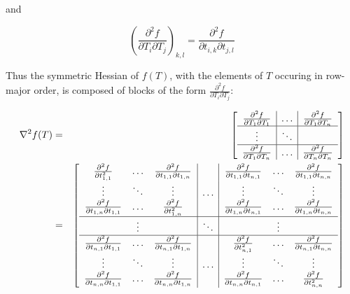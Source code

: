 \documentclass{report}
\begin{document}
and

\begin{equation}
\label{dsecelem}
\left(\frac{\partial^2 f}{\partial T_i \partial T_j}\right)_{k,l} = 
\frac{\partial^2 f}{\partial t_{i,k} \partial t_{j,l}}
\end{equation}

Thus the symmetric Hessian of $f(T)$, with the elements of $T$ occuring in row-major order, is composed of blocks of the form $\frac{\partial^2 f}{\partial T_i \partial T_j}$:

\begin{eqnarray}
\nabla^2 f(T) & = &
\left[ \begin{array}{c|c|c}
\frac{\partial^2 f}{\partial T_1 \partial T_1} &
\ldots &
\frac{\partial^2 f}{\partial T_1 \partial T_n} \\
\hline
\vdots & \ddots \\
\hline
\frac{\partial^2 f}{\partial T_1 \partial T_n} & 
\ldots & 
\frac{\partial^2 f}{\partial T_n \partial T_n} \\
\end{array} \right]
\\ & = &
\left[ \begin{array}{ccc|c|ccc}
\frac{\partial^2 f}{\partial t_{1,1}^2} &
\ldots &
\frac{\partial^2 f}{\partial t_{1,1} \partial t_{1,n}} &
&
\frac{\partial^2 f}{\partial t_{1,1} \partial t_{n,1}} &
\ldots &
\frac{\partial^2 f}{\partial t_{1,1} \partial t_{n,n}} \\
\vdots & \ddots & \vdots &
\ldots &
\vdots & \ddots & \vdots \\
\frac{\partial^2 f}{\partial t_{1,n} \partial t_{1,1}} &
\ldots &
\frac{\partial^2 f}{\partial t_{1,n}^2} &
&
\frac{\partial^2 f}{\partial t_{1,n} \partial t_{n,1}} &
\ldots &
\frac{\partial^2 f}{\partial t_{1,n} \partial t_{n,n}} \\
\hline
& \vdots & & \ddots & & \vdots \\
\hline
\frac{\partial^2 f}{\partial t_{n,1} \partial t_{1,1}} &
\ldots &
\frac{\partial^2 f}{\partial t_{n,1} \partial t_{1,n}} &
&
\frac{\partial^2 f}{\partial t_{n,1}^2} &
\ldots &
\frac{\partial^2 f}{\partial t_{n,1} \partial t_{n,n}} \\
\vdots & \ddots & \vdots &
\ldots &
\vdots & \ddots & \vdots \\
\frac{\partial^2 f}{\partial t_{n,n} \partial t_{1,1}} &
\ldots &
\frac{\partial^2 f}{\partial t_{n,n} \partial t_{1,n}} &
&
\frac{\partial^2 f}{\partial t_{n,n} \partial t_{n,1}} &
\ldots &
\frac{\partial^2 f}{\partial t_{n,n}^2} 
\end{array} \right] \nonumber \\
\end{eqnarray}
\end{document}
